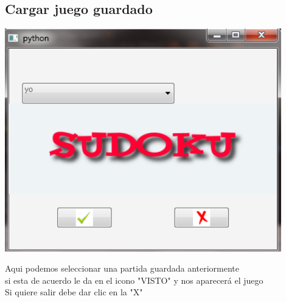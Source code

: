 \documentclass[12pt]{extbook}
\begin{document}
\begin{center}
\section{Cargar juego guardado}
\end{center}
\begin{center}
\includegraphics[width=12cm]{guardarpa.png}
\end{center}
Aqui podemos seleccionar una partida guardada anteriormente \\
si esta de acuerdo le da en el icono "VISTO" y nos aparecerá el juego\\ 
Si quiere salir debe dar clic en la "X" \\
\end{document}
